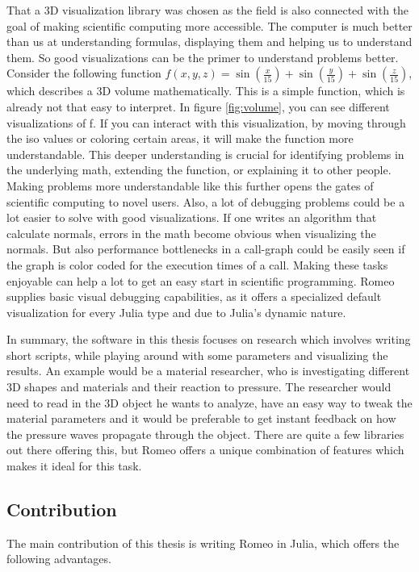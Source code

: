 That a 3D visualization library was chosen as the field is also connected with the goal of making scientific computing more accessible.
The computer is much better than us at understanding formulas, displaying them and helping us to understand them.
So good visualizations can be the primer to understand problems better.
Consider the following function $f(x,y,z)=\sin(\frac{x}{15})+\sin(\frac{y}{15})+\sin(\frac{z}{15})$, which describes a 3D volume mathematically. 
This is a simple function, which is already not that easy to interpret. In figure \ref{fig:volume}, you can see different visualizations of f.
If you can interact with this visualization, by moving through the iso values or coloring certain areas, it will make the function more understandable.
This deeper understanding is crucial for identifying problems in the underlying math, extending the function, or explaining it to other people. Making problems more understandable like this further opens the gates of scientific computing to novel users.
Also, a lot of debugging problems could be a lot easier to solve with good visualizations. If one writes an algorithm that calculate normals, errors in the math become obvious when visualizing the normals.
But also performance bottlenecks in a call-graph could be easily seen if the graph is color coded for the execution times of a call. Making these tasks enjoyable can help a lot to get an easy start in scientific programming. 
Romeo supplies basic visual debugging capabilities, as it offers a specialized default visualization for every Julia type and due to Julia's dynamic nature.

In summary, the software in this thesis focuses on research which involves writing short scripts, while playing around with some parameters and visualizing the results.
An example would be a material researcher, who is investigating different 3D shapes and materials and their reaction to pressure.
The researcher would need to read in the 3D object he wants to analyze, have an easy way to tweak the material parameters and it would be preferable to get instant feedback on how the pressure waves propagate through the object.
There are quite a few libraries out there offering this, but Romeo offers a unique combination of features which makes it ideal for this task.

\subsection{Contribution}
The main contribution of this thesis is writing Romeo in Julia, which offers the following advantages.

